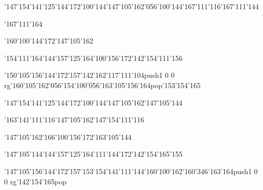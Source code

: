 \null\vfill\ipa\centerline{\enskip\char'147\char'154\char'141\char'125\char'144\char'172\enskip\char'100\char'144\enskip\char'147\char'105\char'162\char'056\char'100\char'144\enskip\enskip\enskip\char'167\char'111\char'116\enskip\char'167\char'111\char'144}\medskip\centerline{\enskip\enskip\enskip\enskip\enskip\enskip\enskip\enskip\enskip\enskip\enskip\enskip\char'167\char'111\char'164\enskip\enskip\enskip\enskip\enskip\enskip\enskip\enskip\enskip}\medskip\centerline{\enskip\enskip\enskip\enskip\enskip\enskip\enskip\enskip\char'160\char'100\char'144\char'172\enskip\enskip\enskip\char'147\char'105\char'162}\medskip\centerline{\enskip\enskip\enskip\enskip\char'154\char'111\char'164\enskip\enskip\enskip\enskip\enskip\char'144\char'157\char'125\char'164\enskip\char'100\char'156\char'172\enskip\char'142\char'154\char'111\char'156}\medskip\centerline{\enskip\enskip\char'150\char'105\char'156\char'144\char'172\enskip\char'157\enskip\char'142\char'162\char'117\char'111\char'104\enskip\pdfcolorstack\match push{1 0 0 rg}\char'160\char'105\char'162\char'056\char'154\char'100\char'056\char'163\char'105\char'156\char'164\pdfcolorstack\match pop{}\enskip\char'153\char'154\char'165}\medskip\vfill\footline{\hfil\tt\folio\hfil}\eject
\null\vfill\ipa\centerline{\enskip\char'147\char'154\char'141\char'125\char'144\char'172\enskip\enskip\enskip\enskip\enskip\enskip\enskip\char'100\char'144\enskip\enskip\enskip\char'147\char'105\char'162\enskip\char'147\char'105\char'144}\medskip\centerline{\enskip\enskip\enskip\enskip\char'163\char'141\char'111\char'116\enskip\enskip\enskip\enskip\char'147\char'105\char'162\enskip\enskip\enskip\enskip\enskip\char'147\char'154\char'111\char'116}\medskip\centerline{\enskip\char'147\char'105\char'162\enskip\enskip\enskip\enskip\char'166\char'100\char'156\char'172\enskip\enskip\enskip\char'163\char'105\char'144}\medskip\centerline{\enskip\enskip\enskip\enskip\char'147\char'105\char'144\enskip\enskip\enskip\enskip\enskip\char'144\char'157\char'125\char'164\enskip\char'111\char'144\char'172\enskip\char'142\char'154\char'165\char'155}\medskip\centerline{\enskip\enskip\char'147\char'105\char'156\char'144\char'172\enskip\char'157\enskip\char'153\char'154\char'141\char'111\char'144\enskip\char'160\char'100\char'162\enskip\enskip\enskip\char'160\char'346\char'163\char'164\enskip\pdfcolorstack\match push{1 0 0 rg}\char'142\char'154\char'165\pdfcolorstack\match pop{}}\medskip\vfill\footline{\hfil\tt\folio\hfil}\eject\bye